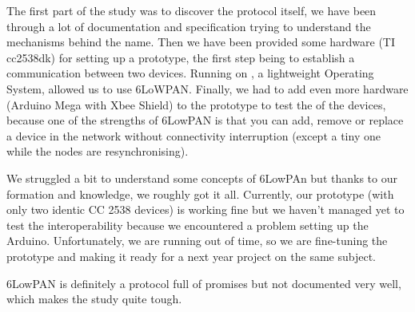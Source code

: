 {The first part of the study was to discover the protocol itself, we have been through a lot of documentation and specification trying to understand the mechanisms behind the name.
Then we have been provided some hardware (TI cc2538dk) for setting up a prototype, the first step being to establish a communication between two devices.
Running on , a lightweight Operating System, allowed us to use 6LoWPAN.
Finally, we had to add even more hardware (Arduino Mega with Xbee Shield) to the prototype to test the  of the devices, because one of the strengths of 6LowPAN is that you can add, remove or replace a device in the network without connectivity interruption (except a tiny one while the nodes are resynchronising). 

We struggled a bit to understand some concepts of 6LowPAn but thanks to our formation and knowledge, we roughly got it all. 
Currently, our prototype (with only two identic CC 2538 devices) is working fine but we haven’t managed yet to test the interoperability because we encountered a problem setting up the Arduino.
Unfortunately, we are running out of time, so we are fine-tuning the prototype and making it ready for a next year project on the same subject.
 
6LowPAN is definitely a protocol full of promises but not documented very well, which makes the study quite tough.
}
